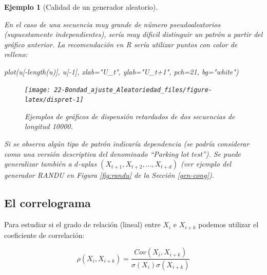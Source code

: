 \documentclass[
]{book}
\newenvironment{Shaded}{\begin{snugshade}}{\end{snugshade}}
\newcommand{\AttributeTok}[1]{\textcolor[rgb]{0.77,0.63,0.00}{#1}}
\newcommand{\DecValTok}[1]{\textcolor[rgb]{0.00,0.00,0.81}{#1}}
\newcommand{\FunctionTok}[1]{\textcolor[rgb]{0.00,0.00,0.00}{#1}}
\newcommand{\NormalTok}[1]{#1}
\newcommand{\SpecialCharTok}[1]{\textcolor[rgb]{0.00,0.00,0.00}{#1}}
\newcommand{\StringTok}[1]{\textcolor[rgb]{0.31,0.60,0.02}{#1}}
\theoremstyle{break}
\newtheorem{example}{Ejemplo}[chapter]
\theoremstyle{nonumberplain}
\begin{document}
\begin{example}[Calidad de un generador aleatorio]
\protect\hypertarget{exm:ret-gen}{}\label{exm:ret-gen}

En el caso de una secuencia muy grande de número pseudoaleatorios (supuestamente independientes), sería muy dificil distinguir un patrón a partir del gráfico anterior. La recomendación en R sería utilizar puntos con color de relleno:

\begin{Shaded}
\begin{Highlighting}[]
\FunctionTok{plot}\NormalTok{(u[}\SpecialCharTok{{-}}\FunctionTok{length}\NormalTok{(u)], u[}\SpecialCharTok{{-}}\DecValTok{1}\NormalTok{], }\AttributeTok{xlab=}\StringTok{"U\_t"}\NormalTok{, }\AttributeTok{ylab=}\StringTok{"U\_t+1"}\NormalTok{, }\AttributeTok{pch=}\DecValTok{21}\NormalTok{, }\AttributeTok{bg=}\StringTok{"white"}\NormalTok{)}
\end{Highlighting}
\end{Shaded}

\begin{figure}[!htb]

{\centering \texttt{[image: 22-Bondad\_ajuste\_Aleatoriedad\_files/figure-latex/dispret-1]} 

}

\caption{Ejemplos de gráficos de dispensión retardados de dos secuencias de longitud 10000.}\label{fig:dispret}
\end{figure}

Si se observa algún tipo de patrón indicaría dependencia (se podría considerar como una versión descriptiva del denominado ``Parking lot test'').
Se puede generalizar también a \(d\)-uplas \((X_{t+1},X_{t+2},\ldots,X_{t+d})\)
(ver ejemplo del generador RANDU en Figura \ref{fig:randu} de la Sección \ref{gen-cong}).
\end{example}

\hypertarget{el-correlograma}{%
\subsection{El correlograma}\label{el-correlograma}}

Para estudiar si el grado de relación (lineal) entre \(X_{i}\) e
\(X_{i+k}\) podemos utilizar el coeficiente de correlación:

\[\rho\left(  X_{i},X_{i+k}\right) = \frac{Cov\left(  X_{i},X_{i+k}\right)    }
{\sigma\left(  X_{i}\right)  \sigma\left(  X_{i+k}\right)  }\]
\end{document}
